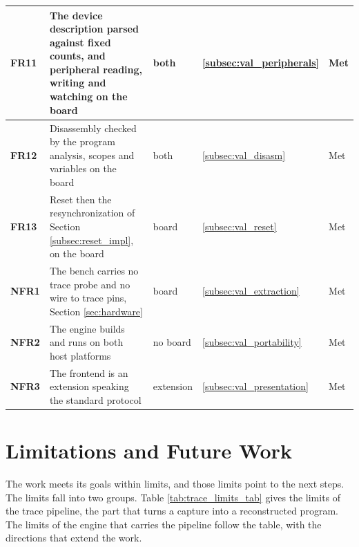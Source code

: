 \begin{table}[htbp]
\begin{tabularx}{\linewidth}{| @{}>{\hsize\bfseries}Y | >{\hsize}Y | >{\hsize}Y | >{\hsize}Y | >{\hsize}Y@{} |}
        \hline
        FR11 & The device description parsed against fixed counts, and peripheral reading, writing and watching on the board & both & \ref{subsec:val_peripherals} & Met \\
        \hline
        FR12 & Disassembly checked by the program analysis, scopes and variables on the board & both & \ref{subsec:val_disasm} & Met \\
        \hline
        FR13 & Reset then the resynchronization of Section \ref{subsec:reset_impl}, on the board & board & \ref{subsec:val_reset} & Met \\
        \hline
        NFR1 & The bench carries no trace probe and no wire to trace pins, Section \ref{sec:hardware} & board & \ref{subsec:val_extraction} & Met \\
        \hline
        NFR2 & The engine builds and runs on both host platforms & no board & \ref{subsec:val_portability} & Met \\
        \hline
        NFR3 & The frontend is an extension speaking the standard protocol & extension & \ref{subsec:val_presentation} & Met \\
        \hline
    \end{tabularx}
\end{table}


\section{Limitations and Future Work}
\label{subsec:limits}
\label{subsec:trace_limits}

The work meets its goals within limits, and those limits point to the next steps. The limits fall into two groups. Table \ref{tab:trace_limits_tab} gives the limits of the trace pipeline, the part that turns a capture into a reconstructed program. The limits of the engine that carries the pipeline follow the table, with the directions that extend the work.

